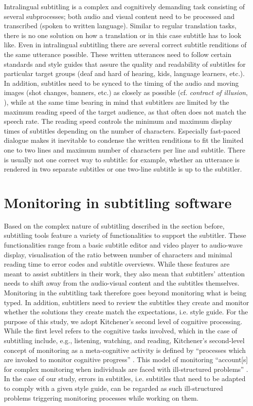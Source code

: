\documentclass[output=paper]{langscibook}
\begin{document}
Intralingual subtitling is a complex and cognitively demanding task consisting of several subprocesses; both audio and visual content need to be processed and transcribed (spoken to written language).
Similar to regular translation tasks, there is no one solution on how a translation or in this case subtitle has to look like.
Even in intralingual subtitling there are several correct subtitle renditions of the same utterance possible.
These written utterances need to follow certain standards and style guides that assure the quality and readability of subtitles for particular target groups (deaf and hard of hearing, kids, language learners, etc.).
In addition, subtitles need to be synced to the timing of the audio and moving images (shot changes, banners, etc.) as closely as possible (cf. \textit{contract of illusion}, \citealt{pedersen2017far}), while at the same time bearing in mind that subtitlers are limited by the maximum reading speed of the target audience, as that often does not match the speech rate.
The reading speed controls the minimum and maximum display times of subtitles depending on the number of characters.
Especially fast-paced dialogue makes it inevitable to condense the written renditions to fit the limited one to two lines and maximum number of characters per line and subtitle.
There is usually not one correct way to subtitle: for example, whether an utterance is rendered in two separate subtitles or one two-line subtitle is up to the subtitler.

\section{Monitoring in subtitling software} 
Based on the complex nature of subtitling described in the section before, subtitling tools  feature a variety of functionalities to support the subtitler.
These functionalities range from a basic subtitle editor and video player to audio-wave display, visualisation of the ratio between number of characters and minimal reading time to error codes and subtitle overviews.
While these features are meant to assist subtitlers in their work, they also mean that subtitlers' attention needs to shift away from the audio-visual content and the subtitles themselves.
Monitoring in the subtitling task therefore goes beyond monitoring what is being typed.
In addition, subtitlers need to review the subtitles they create and monitor whether the solutions they create match the expectations, i.e. style guide.
For the purpose of this study, we adopt Kitchener's second level of cognitive processing.
While the first level refers to the cognitive tasks involved, which in the case of subtitling include, e.g., listening, watching, and reading, Kitchener's second-level concept of monitoring as a meta-cognitive activity is defined by “processes which are invoked to monitor cognitive progress” \citep[225]{kitchener1983cognition}.
This model of monitoring “account[s] for complex monitoring when individuals are faced with ill-structured problems” \citep[222]{kitchener1983cognition}.
In the case of our study, errors in subtitles, i.e. subtitles that need to be adapted to comply with a given style guide, can be regarded as such ill-structured problems triggering monitoring processes while working on them.
\end{document}
